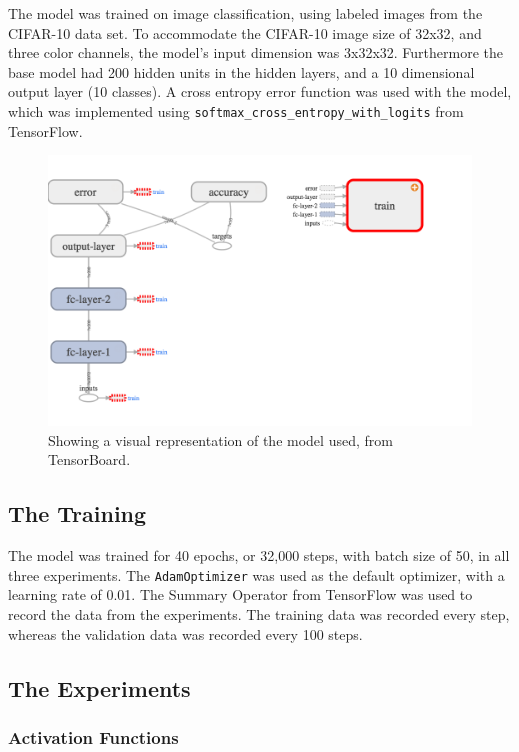 \documentclass[]{article}
\begin{document}
The model was trained on image classification, using labeled images from the CIFAR-10 data set. To accommodate the CIFAR-10 image size of 32x32, and three color channels, the model's input dimension was 3x32x32. Furthermore the base model had 200 hidden units in the hidden layers, and a 10 dimensional output layer (10 classes). A cross entropy error function was used with the model, which was implemented using  \texttt{softmax\_cross\_entropy\_with\_logits} from TensorFlow.

\begin{figure}[h]
	\includegraphics[width=\textwidth]{model_1}
	\caption{Showing a visual representation of the model used, from TensorBoard.}
	\label{part1-model}
	\centering
\end{figure}

\subsection{The Training}

The model was trained for 40 epochs, or 32,000 steps, with batch size of 50, in all three experiments. The \texttt{AdamOptimizer} was used as the default optimizer, with a learning rate of 0.01. The Summary Operator from TensorFlow was used to record the data from the experiments. The training data was recorded every step, whereas the validation data was recorded every 100 steps.

\subsection{The Experiments}


\subsubsection{Activation Functions}
\end{document}
